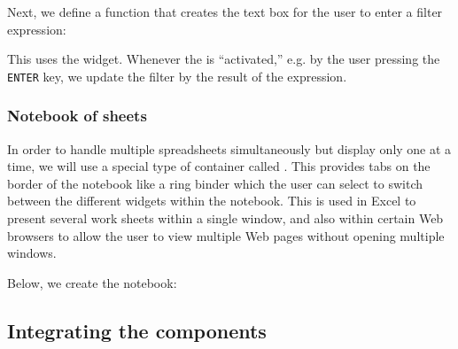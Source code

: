 \documentclass[article,shortnames]{jss}
\begin{document}
Next, we define a function that creates the text box for the user to
enter a filter expression:
This uses the  widget.
Whenever the  is ``activated,'' e.g. by the user
pressing the \texttt{ENTER} key, we update the filter by the result of
the  expression.

\subsubsection{Notebook of sheets}

In order to handle multiple spreadsheets simultaneously but display
only one at a time, we will use a special type of container called
.  This provides tabs on the border of the
notebook like a ring binder which the user can select to switch
between the different widgets within the notebook.  This is used in
Excel to present several work sheets within a single window, and also
within certain Web browsers to allow the user to view multiple Web
pages without opening multiple windows.

Below, we create the notebook:

\subsection{Integrating the components}
\end{document}
